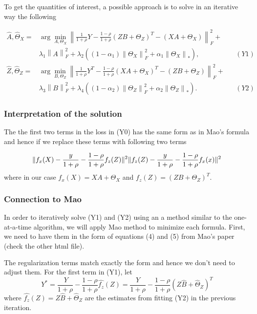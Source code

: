\documentclass[
]{article}
\begin{document}
To get the quantities of interest, a possible approach is to solve in an
iterative way the following

\[
\begin{aligned}
\hat{A}, \hat{\Theta}_X =& \arg \min_{A,\Theta_X} \left\| \frac{1}{1 + \rho}  Y - \frac{1 - \rho}{1 + \rho} (ZB + \Theta_Z)^T - (XA + \Theta_X) \right\|_F^2 + \\
 &\lambda_1 \left\| A \right\|_F^2 + \lambda_2 \left((1 - \alpha_1) \left\| \Theta_X \right\|_F^2 + \alpha_1 \left\| \Theta_X \right\|_* \right), && (Y1) \\
\hat{Z}, \hat{\Theta}_Z =& \arg \min_{B,\Theta_Z} \left\| \frac{1}{1 + \rho} Y^T - \frac{1 - \rho}{1 + \rho} (XA + \Theta_X)^T - (ZB + \Theta_Z) \right\|_F^2 +\\
 &\lambda_3 \left\| B \right\|_F^2 + \lambda_4 \left((1 - \alpha_2) \left\| \Theta_Z \right\|_F^2 + \alpha_2 \left\| \Theta_Z \right\|_* \right). && (Y2)
\end{aligned}
\]

\hypertarget{interpretation-of-the-solution}{%
\subsubsection{Interpretation of the
solution}\label{interpretation-of-the-solution}}

The the first two terms in the loss in (Y0) has the same form as in
Mao's formula and hence if we replace these terms with following two
terms

\[
\| f_x(X) - \frac{y}{1+\rho} - \frac{1-\rho}{1+\rho}f_z(Z)\|^2 \\
\| f_z(Z) - \frac{y}{1+\rho} - \frac{1-\rho}{1+\rho}f_x(x)\|^2
\] where in our case \(f_x(X)=XA+\Theta_X\) and
\(f_z(Z)=(ZB+\Theta_Z)^T\).

\hypertarget{connection-to-mao}{%
\subsubsection{Connection to Mao}\label{connection-to-mao}}

In order to iteratively solve (Y1) and (Y2) using an a method similar to
the one-at-a-time algorithm, we will apply Mao method to minimize each
formula. First, we need to have them in the form of equations (4) and
(5) from Mao's paper (check the other html file).

The regularization terms match exactly the form and hence we don't need
to adjust them. For the first term in (Y1), let
\[Y^* = \frac{\ Y}{1+\rho} - \frac{1-\rho}{1+\rho}\hat {f_z}(Z) = \frac{Y}{1+\rho} - \frac{1-\rho}{1+\rho}(Z\hat{B}+\hat{\Theta}_Z)^T\]
where \(\hat {f_z}(Z) = Z\hat{B}+\hat{\Theta}_Z\) are the estimates from
fitting (Y2) in the previous iteration.
\end{document}
